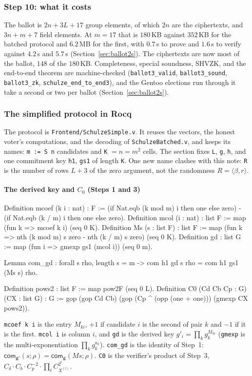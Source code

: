 \documentclass[11pt,a4paper]{article}
\newcommand{\com}{\mathsf{com}}
\newcommand{\rocq}[1]{\texttt{#1}}
\theoremstyle{remark}
\begin{document}
\subsubsection*{Step 10: what it costs}
The ballot is $2n + 3L + 17$ group elements, of which $2n$ are the
ciphertexts, and $3n + m + 7$ field elements. At $m = 17$ that is
$180$\,KB against $352$\,KB for the batched protocol and $6.2$\,MB for
the first, with $0.7$\,s to prove and $1.6$\,s to verify against
$4.2$\,s and $5.7$\,s (Section~\ref{sec:ballot2s}). The ciphertexts are
now most of the ballot, $148$ of the $180$\,KB. Completeness, special
soundness, SHVZK, and the end-to-end theorem are machine-checked
(\rocq{ballot3\_valid}, \rocq{ballot3\_sound}, \rocq{ballot3\_zk},
\rocq{schulze\_end\_to\_end3}), and the Gentoo elections run through it
take a second or two per ballot (Section~\ref{sec:ballot2s}).

\subsubsection*{The simplified protocol in Rocq}
The protocol is \rocq{Frontend/SchulzeSimple.v}. It reuses the vectors,
the honest voter's computations, and the decoding of
\rocq{SchulzeBatched.v}, and keeps its names: \rocq{m := S n} candidates
and \rocq{K} $= n = m^2$ cells. The section fixes \rocq{L}, \rocq{g},
\rocq{h}, and one commitment key \rocq{h1}, \rocq{gs1} of length
\rocq{K}. One new name clashes with this note: \rocq{R} is the number of
rows $L + 3$ of the zero argument, not the randomness $R = \langle \beta,
r \rangle$.

\paragraph{The derived key and $C_0$ (Steps 1 and 3)}
\begin{coq}
Definition mcoef (k i : nat) : F :=
  (if Nat.eqb (k mod m) i then one else zero) - (if Nat.eqb (k / m) i then one else zero).
Definition mcol (i : nat) : list F := map (fun k => mcoef k i) (seq 0 K).
Definition Ms (s : list F) : list F :=
  map (fun k => nth (k mod m) s zero - nth (k / m) s zero) (seq 0 K).
Definition gd : list G := map (fun i => gmexp gs1 (mcol i)) (seq 0 m).

Lemma com_gd : forall s rho, length s = m -> com h1 gd s rho = com h1 gs1 (Ms s) rho.

Definition pows2 : list F := map pow2F (seq 0 L).
Definition C0 (Cd Cb Cp : G) (CX : list G) : G :=
  gop (gop Cd Cb) (gop (Cp ^ (opp (one + one))) (gmexp CX pows2)).
\end{coq}
\rocq{mcoef k i} is the entry $M_{ki}$, $+1$ if candidate $i$ is the
second of pair $k$ and $-1$ if it is the first. \rocq{mcol i} is column
$i$, and \rocq{gd} is the derived key $g'_i = \prod_k g_k^{M_{ki}}$
(\rocq{gmexp} is the multi-exponentiation $\prod_k g_k^{a_k}$).
\rocq{com\_gd} is the identity of Step~1:
$\com_{\mathbf{g}'}(s; \rho) = \com_{\mathbf{g}}(Ms; \rho)$. \rocq{C0} is
the verifier's product of Step~3, $C_\delta \cdot C_b \cdot C_p^{-2} \cdot
\prod_t C_{X^{(t)}}^{2^{t}}$.
\end{document}
